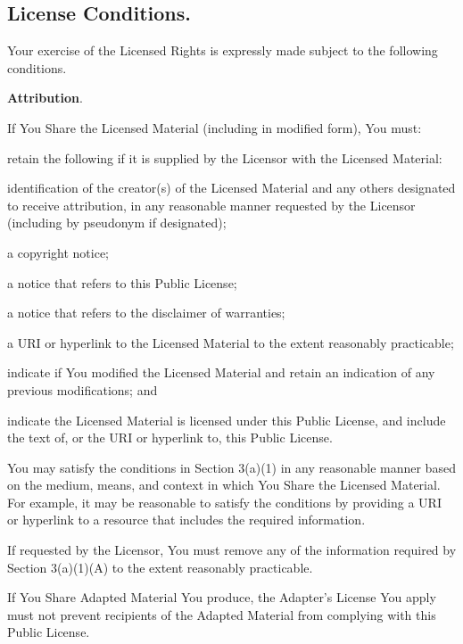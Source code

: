   \subsection{License Conditions.}
    Your exercise of the Licensed Rights is expressly made subject to the following conditions.
    \begin{myEnumerate}
      \item \textbf{Attribution}.
      \begin{myEnumerate}
        \item If You Share the Licensed Material (including in modified form), You must:
        \begin{myEnumerate}
          \item retain the following if it is supplied by the Licensor with the Licensed Material:
          \begin{myEnumerate}
            \item identification of the creator(s) of the Licensed Material and any others designated to receive attribution,
            in any reasonable manner requested by the Licensor (including by pseudonym if designated);
            \item a copyright notice;
            \item a notice that refers to this Public License;
            \item a notice that refers to the disclaimer of warranties;
            \item a URI or hyperlink to the Licensed Material to the extent reasonably practicable;
          \end{myEnumerate}
          \item indicate if You modified the Licensed Material and retain an indication of any previous modifications; and
          \item indicate the Licensed Material is licensed under this Public License, and include the text of, or the URI or
          hyperlink to, this Public License.
        \end{myEnumerate}
        \item You may satisfy the conditions in Section 3(a)(1) in any reasonable manner based on the medium, means, and
        context in which You Share the Licensed Material. For example, it may be reasonable to satisfy the conditions by
        providing a URI or hyperlink to a resource that includes the required information.
        \item If requested by the Licensor, You must remove any of the information required by Section 3(a)(1)(A) to the
        extent reasonably practicable.
        \item If You Share Adapted Material You produce, the Adapter's License You apply must not prevent recipients of the
        Adapted Material from complying with this Public License.
      \end{myEnumerate}
    \end{myEnumerate}

